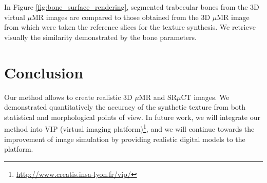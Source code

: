 In Figure \ref{fig:bone_surface_rendering}, segmented trabecular bones from the 3D virtual $\mu$MR images are compared to those obtained from the 3D $\mu$MR image 
from which were taken the reference slices for the texture synthesis. We retrieve visually the similarity demonstrated by the bone parameters.

\section{Conclusion}
\label{sec:Conclusions}

Our method allows to create realistic 3D $\mu$MR and SR$\mu$CT images. We demonstrated quantitatively the accuracy of 
the synthetic texture from both statistical and morphological points of view. 
In future work, we will integrate our method into VIP (virtual imaging platform)\footnote{\url{http://www.creatis.insa-lyon.fr/vip/}}, 
and we will continue towards the improvement of image simulation by providing realistic digital models to the platform.



